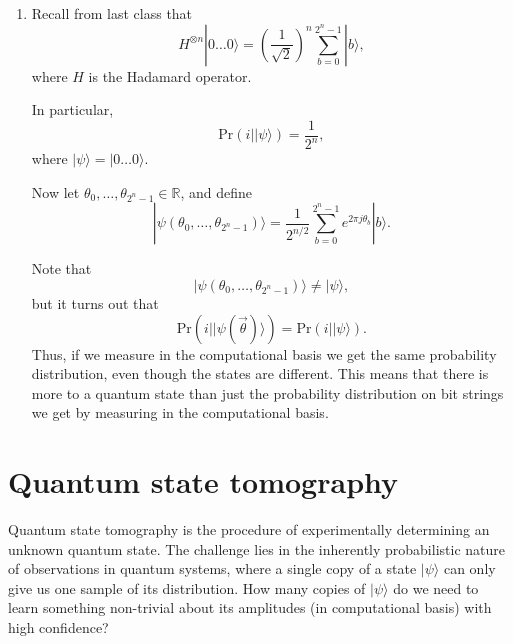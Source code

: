 \documentclass{article}
\newtheorem*{remark}{Remark}
\newcommand{\ket}[1]{|#1\rangle}
\begin{document}
\begin{enumerate}
          Note that we get for free 
          \begin{align*}
               \mathrm{Pr(1 | \ket \psi)} &= 1 - \mathrm{Pr(0 | \ket \psi)}\\
                                          &= \frac{1}{10}
          \end{align*}
          by the complement rule.
          
          \begin{remark}
               We should stress that the measurement together with the state induces
               a probability distribution on the set of all bit strings that 
               is entirely determined by the amplitudes of $z_i$ 
               by Equation (\ref{eq:proj-prob-amp}).
          \end{remark}

     \item
          Recall from last class that 
          $$ H^{\otimes n}\ket{0\dots 0} = \left( \frac{1}{\sqrt 2}\right )^n
                                             \sum^{2^n - 1}_{b=0} \ket b, $$
          where $H$ is the Hadamard operator.
          
          In particular,
          $$ \mathrm{Pr}(i | \ket \psi) = \frac{1}{2^n},$$
          where $\ket \psi = \ket{0 \dots 0}$.
          
          Now let $\theta_0, \dots, \theta_{2^n - 1} \in \mathbb R$, 
          and define 
          $$ \ket{\psi(\theta_0, \dots, \theta_{2^n-1})} 
             = \frac{1}{2^{n/2}} \sum^{2^n-1}_{b=0}e ^{2 \pi j \theta_b} \ket b.$$
          
          Note that $$ \ket{\psi(\theta_0, \dots, \theta_{2^n-1})} \neq \ket \psi,$$
          but it turns out that 
          $$ \mathrm{Pr}(i | \ket{\psi (\vec \theta)}) = \mathrm{Pr}(i | \ket \psi).$$
          Thus, if we measure in the computational basis we get the same probability
          distribution, even though the states are different.
          This means that there is more to a quantum state than 
          just the probability distribution
          on bit strings we get by measuring in the computational basis.
\end{enumerate}

\section{Quantum state tomography}
Quantum state tomography is the procedure of experimentally
determining an unknown quantum state.
The challenge lies in the inherently probabilistic nature 
of observations in quantum systems,
where a single copy of a state $\ket \psi$ can only give us one sample of
its distribution.
How many copies of $\ket \psi$ do we need to learn something non-trivial 
about its amplitudes (in computational basis) with high confidence?
\end{document}
